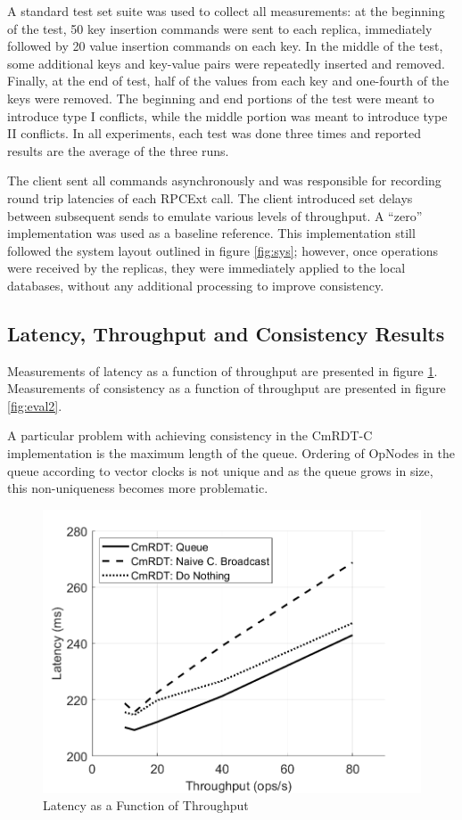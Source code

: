 \documentclass[sigconf,nonacm,10pt]{acmart}
\begin{document}
A standard test set suite was used to collect all measurements: at the beginning of the test, 50 key insertion commands were sent to each replica, immediately followed by 20 value insertion commands on each key. In the middle of the test, some additional keys and key-value pairs were repeatedly inserted and removed. Finally, at the end of test, half of the values from each key and one-fourth of the keys were removed. The beginning and end portions of the test were meant to introduce type I conflicts, while the middle portion was meant to introduce type II conflicts. In all experiments, each test was done three times and reported results are the average of the three runs.

The client sent all commands asynchronously and was responsible for recording round trip latencies of each RPCExt call. The client introduced set delays between subsequent sends to emulate various levels of throughput. A ``zero'' implementation was used as a baseline reference. This implementation still followed the system layout outlined in figure \ref{fig:sys}; however, once operations were received by the replicas, they were immediately applied to the local databases, without any additional processing to improve consistency.

\subsection{Latency, Throughput and Consistency Results}
Measurements of latency as a function of throughput are presented in figure \ref{fig:eval1}. Measurements of consistency as a function of throughput are presented in figure \ref{fig:eval2}. 

A particular problem with achieving consistency in the CmRDT-C implementation is the maximum length of the queue. Ordering of OpNodes in the queue according to vector clocks is not unique and as the queue grows in size, this non-uniqueness becomes more problematic.

\begin{figure}[h]
  \centering
  \includegraphics[width=\linewidth]{Fig7Eval1}
  \caption{Latency as a Function of Throughput}
  \label{fig:eval1}
\end{figure}
\end{document}
